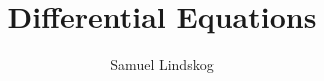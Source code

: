 \documentclass[nobib,notoc]{tufte-handout}
\begin{document}
\theoremstyle{definition}\newtheorem{defi}{Definition}[section]
\theoremstyle{definition}\newtheorem{axiom}{Axiom}[section]
\theoremstyle{definition}\newtheorem{thm}{Theorem}[section]
\theoremstyle{definition}\newtheorem{cor}{Corollary}[section]
\theoremstyle{definition}\newtheorem{lem}{Lemma}[section]
\theoremstyle{remark}\newtheorem*{notat}{Notation}
\theoremstyle{remark}\newtheorem*{rema}{Remark}
\theoremstyle{definition}\newtheorem{problem}{Problem}
\newenvironment{prob}[1]{\protect\setcounter{problem}{#1}\addtocounter{problem}{-1}\begin{problem}}{\end{problem}}

\title{Differential Equations}
\author{Samuel Lindskog}
\maketitle

\setcounter{section}{1}
\end{document}
